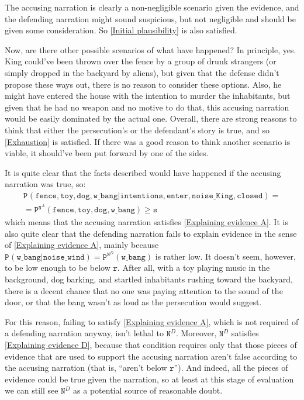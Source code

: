 \documentclass[10pt,leqno]{article}
\newcommand{\prcon}[3]{\mbox{$\mathtt{P}^{#3}(\mathtt{#1}\vert \mathtt{#2})$}}
\newcommand{\prtext}[2]{\mbox{$\mathtt{P}^{#2}(\mathtt{#1})$}}
\begin{document}
The accusing narration is clearly a non-negligible scenario given the evidence, and  the defending narration might sound suspicious, but not negligible and should be given some consideration. So \eqref{Initial plausibility} is also satisfied.

Now, are there other possible scenarios of what have happened? In principle, yes. King could've been thrown over the fence by a group of drunk strangers (or simply dropped in the backyard by aliens), but given that the defense didn't propose these  ways out, there is no reason to consider these  options. Also, he might have  entered the house with the intention to murder the inhabitants, but given that he had no weapon and no motive to do that, this accusing narration would be easily dominated by the actual one. Overall, there are strong reasons to think that either the persecution's or the defendant's story is true, and so \eqref{Exhaustion} is satisfied. If there was a good reason to think another scenario is viable, it should've been put forward by one of the sides.



It is quite clear that the facts described would have happened if the accusing narration was true, so: \begin{align*}\prcon{fence,toy,dog,w\underline{\,\,}bang}{intentions,enter,noise\underline{\,\,}King,closed}{} = \\ = \prtext{fence,toy,dog,w\underline{\,\,}bang}{\mathtt{N}^A} \geq \mathtt{s}
\end{align*} which means that  the accusing narration satisfies \eqref{Explaining evidence A}.
 It is also quite clear that the defending narration fails to explain evidence in the sense of \eqref{Explaining evidence A}, mainly because  $\prcon{w\underline{\,\,}bang}{noise\underline{\,\,}wind}{}=\prtext{w\underline{\,\,}bang}{\mathtt{N}^D}$ is rather low. It doesn't seem, however, to be low enough to be below $\mathtt{r}$. After all, with a toy playing music in the background, dog barking, and startled inhabitants rushing toward the backyard, there is a decent chance that no one was paying attention to the sound of the door, or that the bang wasn't as loud as the persecution would suggest.
 
 For this reason, failing to satisfy \eqref{Explaining evidence A}, which is not required of a defending narration anyway, isn't lethal to $\mathtt{N}^D$. Moreover,  $\mathtt{N}^D$ satisfies \eqref{Explaining evidence D}, because that condition requires only that those pieces of evidence that are used to support the accusing narration aren't false according to the accusing narration (that is, ``aren't below $\mathtt{r}$''). And indeed, all the pieces of evidence  could be true given the narration, so at least at this stage of evaluation we can still see $\mathtt{N}^D$ as a potential source of reasonable doubt.
\end{document}
